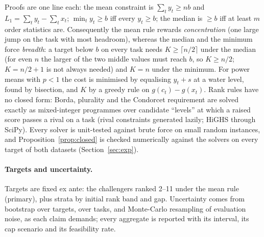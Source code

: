 Proofs are one line each: the mean constraint is $\sum_t y_t\ge nb$ and $L_1=\sum_t y_t-\sum_t x_t$; $\min_t y_t\ge b$ iff every $y_t\ge b$; the median is $\ge b$ iff at least $m$ order statistics are. Consequently the mean rule rewards \emph{concentration} (one large jump on the task with most headroom), whereas the median and the minimum force \emph{breadth}: a target below $b$ on every task needs $K\ge\lceil n/2\rceil$ under the median (for even $n$ the larger of the two middle values must reach $b$, so $K\ge n/2$; $K=n/2+1$ is not always needed) and $K=n$ under the minimum. For power means with $p<1$ the cost is minimised by equalising $y_t+s$ at a water level, found by bisection, and $K$ by a greedy rule on $g(c_t)-g(x_t)$. Rank rules have no closed form: Borda, plurality and the Condorcet requirement are solved exactly as mixed-integer programmes over candidate ``levels'' at which a raised score passes a rival on a task (rival constraints generated lazily; HiGHS through SciPy). Every solver is unit-tested against brute force on small random instances, and Proposition~\ref{prop:closed} is checked numerically against the solvers on every target of both datasets (Section~\ref{sec:exp}).

\paragraph{Targets and uncertainty.}
Targets are fixed ex ante: the challengers ranked 2--11 under the mean rule (primary), plus strata by initial rank band and gap. Uncertainty comes from bootstrap over targets, over tasks, and Monte-Carlo resampling of evaluation noise, as each claim demands; every aggregate is reported with its interval, its cap scenario and its feasibility rate.
